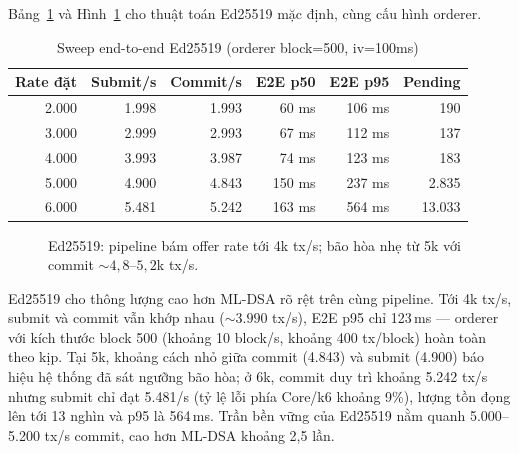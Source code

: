 Bảng~\ref{tab:e2e-ed25519} và Hình~\ref{fig:e2e-ed25519} cho thuật toán
Ed25519 mặc định, cùng cấu hình orderer.

\begin{table}[H]
\centering
\caption{Sweep end-to-end Ed25519 (orderer block=500, iv=100ms)}
\label{tab:e2e-ed25519}
\begin{tabular}{@{}rrrrrr@{}}
\toprule
Rate đặt & Submit/s & Commit/s & E2E p50 & E2E p95 & Pending \\
\midrule
2.000  & 1.998 & 1.993 & 60 ms  & 106 ms & 190 \\
3.000  & 2.999 & 2.993 & 67 ms  & 112 ms & 137 \\
4.000  & 3.993 & 3.987 & 74 ms  & 123 ms & 183 \\
5.000  & 4.900 & 4.843 & 150 ms & 237 ms & 2.835 \\
6.000  & 5.481 & 5.242 & 163 ms & 564 ms & 13.033 \\
\bottomrule
\end{tabular}
\end{table}

\begin{figure}[H]
\centering
{}
\caption{Ed25519: pipeline bám offer rate tới 4k tx/s; bão hòa nhẹ từ 5k với commit
${\sim}4,8$--$5,2$k tx/s.}
\label{fig:e2e-ed25519}
\end{figure}

Ed25519 cho thông lượng cao hơn ML-DSA rõ rệt trên cùng pipeline. Tới 4k
tx/s, submit và commit vẫn khớp nhau (${\sim}3.990$ tx/s), E2E p95 chỉ
123\,ms --- orderer với kích thước block 500 (khoảng 10 block/s, khoảng 400
tx/block) hoàn toàn theo kịp. Tại 5k, khoảng cách nhỏ giữa commit (4.843) và
submit (4.900) báo hiệu hệ thống đã sát ngưỡng bão hòa; ở 6k, commit duy trì
khoảng 5.242 tx/s nhưng submit chỉ đạt 5.481/s (tỷ lệ lỗi phía Core/k6 khoảng
9\%), lượng tồn đọng lên tới 13 nghìn và p95 là 564\,ms. Trần bền vững của
Ed25519 nằm quanh 5.000--5.200 tx/s commit, cao hơn ML-DSA khoảng 2,5 lần.

